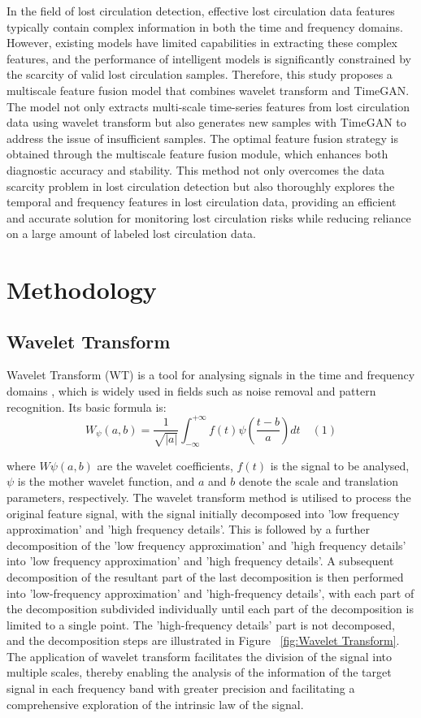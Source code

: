 \documentclass[journal,article,submit,pdftex,moreauthors]{Definitions/mdpi}
\begin{document}
In the field of lost circulation detection, effective lost circulation data features typically contain complex information in both the time and frequency domains. However, existing models have limited capabilities in extracting these complex features, and the performance of intelligent models is significantly constrained by the scarcity of valid lost circulation samples. Therefore, this study proposes a multiscale feature fusion model that combines wavelet transform and TimeGAN. The model not only extracts multi-scale time-series features from lost circulation data using wavelet transform but also generates new samples with TimeGAN to address the issue of insufficient samples. The optimal feature fusion strategy is obtained through the multiscale feature fusion module, which enhances both diagnostic accuracy and stability. This method not only overcomes the data scarcity problem in lost circulation detection but also thoroughly explores the temporal and frequency features in lost circulation data, providing an efficient and accurate solution for monitoring lost circulation risks while reducing reliance on a large amount of labeled lost circulation data.
\section{Methodology}
\subsection{Wavelet Transform}

Wavelet Transform (WT) is a tool for analysing signals in the time and frequency domains \cite{Grossmann1984}, which is widely used in fields such as noise removal and pattern recognition. Its basic formula is:
\[{{W}_{\psi }}(a,b)=\frac{1}{\sqrt{|a|}}\mathop{\int }_{-\infty }^{+\infty }f(t)\psi (\frac{t-b}{a})dt\quad (1)\]

where $W\psi(a, b)$ are the wavelet coefficients, $f(t)$ is the signal to be analysed, $\psi$ is the mother wavelet function, and $a$ and $b$ denote the scale and translation parameters, respectively.
The wavelet transform method is utilised to process the original feature signal, with the signal initially decomposed into 'low frequency approximation' and 'high frequency details'. This is followed by a further decomposition of the 'low frequency approximation' and 'high frequency details' into 'low frequency approximation' and 'high frequency details'. A subsequent decomposition of the resultant part of the last decomposition is then performed into 'low-frequency approximation' and 'high-frequency details', with each part of the decomposition subdivided individually until each part of the decomposition is limited to a single point. The 'high-frequency details' part is not decomposed, and the decomposition steps are illustrated in Figure ~\ref{fig:Wavelet Transform}. The application of wavelet transform facilitates the division of the signal into multiple scales, thereby enabling the analysis of the information of the target signal in each frequency band with greater precision and facilitating a comprehensive exploration of the intrinsic law of the signal.
\end{document}
